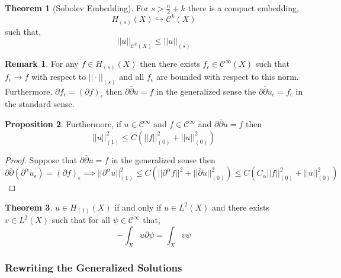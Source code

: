 \documentclass[12pt]{extarticle}
\theoremstyle{definition}
\newtheorem{theorem}{Theorem}[section]
\newtheorem{proposition}[theorem]{Proposition}
\newtheorem{remark}{Remark}
\newcommand{\Class}[2]{\mathcal{C}^{#1} \left( #2 \right)}
\begin{document}
\begin{theorem}[Sobolev Embedding]
For $s > \frac{n}{2} + k$ there is a compact embedding,
\[ H_{(s)}(X) \hookrightarrow  \Class{k}{X} \]
such that,
\[ || u ||_{\Class{k}{X}} \le || u ||_{(s)} \]
\end{theorem}
\begin{remark}
For any $f \in H_{(s)}(X)$ then there exists $f_{\epsilon} \in \Class{\infty}{X}$ such that $f_{\epsilon} \to f$ with respect to $|| \cdot ||_{(s)}$ and all $f_{\epsilon}$ are bounded with respect to this norm. Furthermore, $\partial f_{\epsilon} = (\partial f)_{\epsilon}$ then $\partial \bar{\partial} u = f$ in the generalized sense the $\partial \bar{\partial} u_{\epsilon} = f_{\epsilon}$ in the standard sense. 
\end{remark}
\begin{proposition}
Furthermore, if $u \in \mathcal{C}^\infty$ and $f \in \mathcal{C}^\infty$ and $\partial \bar{\partial} u = f$ then 
\[ || u ||_{(1)}^2 \le C \left( || f ||_{(0)}^2 + || u ||_{(0)}^2 \right) \]
\end{proposition}
\begin{proof}
Suppose that $\partial \bar{\partial} u = f$ in the generalized sense then 
\[ \partial \bar{\partial} (\partial^{\alpha} u_{\epsilon}) = (\partial f)_{\epsilon} \implies ||\partial^{\alpha} u||_{(1)}^2 \le C \left( || \partial^{\alpha} f||^2 + || \bar{\partial} u ||_{(0)}^2 \right) \le C \left( C_{\alpha} ||f||_{(0)}^2 + || u ||_{(0)}^2 \right)  \]
\end{proof} 

\begin{theorem}
$u \in H_{(1)}(X)$ if and only if $u \in L^2(X)$ and there exists $v \in L^2(X)$ such that for all $\psi \in \mathcal{C}^{\infty}$ that,
\[ - \int_X u \partial \psi = \int_X v \psi \]
\end{theorem}

\subsubsection{Rewriting the Generalized Solutions}
\end{document}
